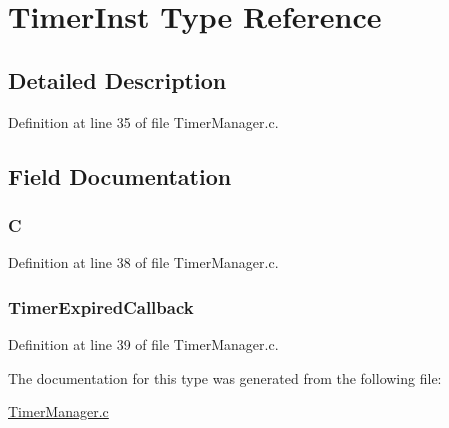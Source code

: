 \hypertarget{type_timer_inst}{
\section{TimerInst Type Reference}
\label{type_timer_inst}
}
\par
\par


\subsection{Detailed Description}


Definition at line 35 of file TimerManager.c.



\subsection{Field Documentation}
\hypertarget{type_timer_inst_a4a70169ff33fd08b4dd3bc11ac0a3012}{
\subsubsection[{\_\-\_\-pad0\_\-\_\-}]{ {\bfseries C } }}
\label{type_timer_inst_a4a70169ff33fd08b4dd3bc11ac0a3012}


Definition at line 38 of file TimerManager.c.

\hypertarget{type_timer_inst_ab20c3452dcb28d80c327d897355c783a}{
\subsubsection[{Callback}]{ {\bfseries TimerExpiredCallback } }}
\label{type_timer_inst_ab20c3452dcb28d80c327d897355c783a}


Definition at line 39 of file TimerManager.c.



The documentation for this type was generated from the following file:\begin{DoxyCompactItemize}
\item 
\hyperlink{_timer_manager_8c}{TimerManager.c}\end{DoxyCompactItemize}
